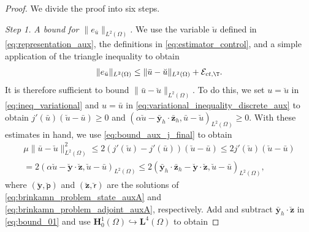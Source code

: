 \documentclass[final]{siamart0216}
\begin{document}
\begin{proof}
We divide the proof into six steps.

\emph{Step 1.} \emph{A bound for $\|e_{\bar{u}}\|_{L^2(\Omega)}$.} We use the variable $\breve{u}$ defined in \eqref{eq:representation_aux}, the definitions in \eqref{eq:estimator_control}, and a simple application of the triangle inequality to obtain
\begin{align}\label{eq:bound_00}
\|e_{\bar{u}}\|_{L^2(\Omega)}\leq \|\bar{u}-\breve{u}\|_{L^2(\Omega)}+\mathcal{E}_{ct,\T}.
\end{align}
It is therefore sufficient to bound $\|\bar{u}-\breve{u}\|_{L^2(\Omega)}$. To do this, we set $u=\breve{u}$ in \eqref{eq:ineq_variational} and $u=\bar{u}$ in \eqref{eq:variational_inequality_discrete_aux} to obtain $j'(\bar{u})(\breve{u}-\bar{u})\geq 0$ and $(\alpha \breve{u}-\bar{\mathbf{y}}_{h}\cdot \bar{\mathbf{z}}_{h},\bar{u}-\breve{u})_{L^2(\Omega)}\geq 0$.
With these estimates in hand, we use \eqref{eq:bound_aux_j_final} to obtain
\begin{multline}\label{eq:bound_01}
\mu\|\bar{u}-\breve{u}\|_{L^2(\Omega)}^2
\leq 
2 (j'(\breve{u})-j'(\bar{u}))(\breve{u}-\bar{u})
\leq 
2 j'(\breve{u})(\breve{u}-\bar{u})\\
= 
2 (\alpha \breve{u}-\breve{\mathbf{y}}\cdot \breve{\mathbf{z}},\breve{u}-\bar{u})_{L^2(\Omega)}
\leq 
2 (\bar{\mathbf{y}}_{h}\cdot \bar{\mathbf{z}}_{h}-\breve{\mathbf{y}}\cdot \breve{\mathbf{z}},\breve{u}-\bar{u})_{L^2(\Omega)},
\end{multline}
where $(\breve{\mathbf{y}},\breve{\mathsf{p}})$ and $(\breve{\mathbf{z}},\breve{\mathsf{r}})$ are the solutions of \eqref{eq:brinkamn_problem_state_auxA} and \eqref{eq:brinkamn_problem_adjoint_auxA}, respectively. Add and subtract $\bar{\mathbf{y}}_{h}\cdot \breve{\mathbf{z}}$ in \eqref{eq:bound_01} and use $\mathbf{H}_0^1(\Omega) \hookrightarrow \mathbf{L}^4(\Omega)$ to obtain

\end{proof}
\end{document}
